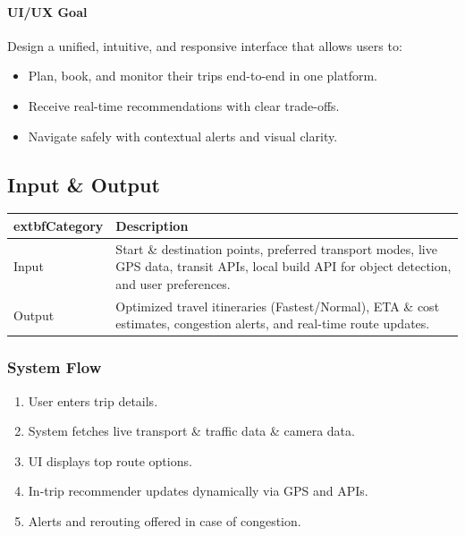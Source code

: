 \paragraph{UI/UX Goal} Design a unified, intuitive, and responsive interface that allows users to:
\begin{itemize}
  \item Plan, book, and monitor their trips end-to-end in one platform.
  \item Receive real-time recommendations with clear trade-offs.
  \item Navigate safely with contextual alerts and visual clarity.
\end{itemize}

\subsection{Input \& Output}
\renewcommand{\arraystretch}{1.12}
\begin{tabularx}{\textwidth}{|>{\raggedright\arraybackslash}p{2.4cm}|>{\raggedright\arraybackslash}X|}
\hline
	extbf{Category} & \textbf{Description} \\
\hline
Input & Start \& destination points, preferred transport modes, live GPS data, transit APIs, local build API for object detection, and user preferences. \\
\hline
Output & Optimized travel itineraries (Fastest/Normal), ETA \& cost estimates, congestion alerts, and real-time route updates. \\
\hline
\end{tabularx}

\subsubsection{System Flow}
\begin{enumerate}
  \item User enters trip details.
  \item System fetches live transport \& traffic data \& camera data.
  \item UI displays top route options.
  \item In-trip recommender updates dynamically via GPS and APIs.
  \item Alerts and rerouting offered in case of congestion.
\end{enumerate}

